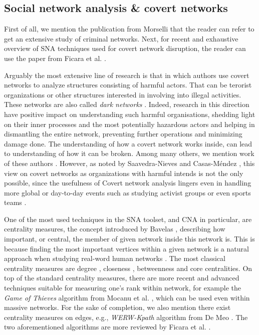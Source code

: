 \subsection{Social network analysis \& covert networks}

First of all, we mention the publication from Morselli \cite{Morselli2009} that the reader can refer to get
an extensive study of criminal networks.
Next, for recent and exhaustive overview of SNA techniques used for covert network disruption,
the reader can use the paper from Ficara et al. \cite{Ficara2022}.

Arguably the most extensive line of research is that in which authors use covert networks to analyze structures consisting of
harmful actors.
That can be terorist organizations or other structures interested in involving into illegal activities. These networks are
also called \emph{dark networks} \cite{Raab2003}.
Indeed, research in this direction have positive impact on understanding such harmful organisations,
shedding light on their inner processes and the most potentially hazardous actors and helping in dismantling the entire network,
preventing further operations and minimizing damage done.
The understanding of how a covert network works inside, can lead to understanding of how it can be broken.
Among many others, we mention work of these authors \cite{Waniek2017,Dey2019,Raab2003,Lindelauf2009,Xu2005,Ressler2006}.
However, as noted by Saavedra-Nieves and Casas-Méndez \cite{SaavedraNieves2023}, this view on covert networks as organizations with harmful
intends is not the only possible, since the usefulness of Covert network analysis lingers even in handling more global or day-to-day events
such as studying activist groups \cite{Crossley2012} or even sports teams \cite{Buldú2019}.

One of the most used techniques in the SNA toolset, and CNA in particular, are centrality measures,
the concept introduced by Bavelas \cite{Bavelas1948},
describing how important, or central, the member of given network inside this network is.
This is because finding the most important vertices within a given network is a natural approach when studying real-word human networks \cite{Crescenzi2016}.
    The most classical centrality measures are degree \cite{Shaw1954}, closeness \cite{Beauchamp1965},
    betweenness \cite{Anthonisse1971,Freeman1977} and core \cite{Seidman1983} centralities.
On top of the standard centrality measures, there are more recent and advanced techniques suitable for measuring one's rank within network,
for example the \emph{Game of Thieves} algorithm from Mocanu et al. \cite{Mocanu2018}, which can be used even within massive networks.
For the sake of completion, we also mention there exist centrality measures on edges, e.g.,
\emph{WERW-Kpath} algorithm from {De Meo} \cite{DeMeo2013}.
The two aforementioned algorithms are more reviewed by Ficara et al. \cite{Ficara2021}.

